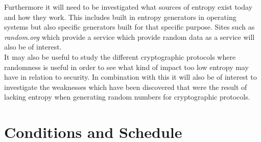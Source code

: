 \documentclass[a4paper,11pt]{report}
\begin{document}
\noindent
Furthermore it will need to be investigated what sources of entropy exist today
and how they work. This includes built in entropy generators in operating 
systems but also specific generators built for that specific purpose. Sites
such as \textit{random.org} which provide a service which provide random 
data as a service will also be of interest.
\\

\noindent
It may also be useful to study the different cryptographic protocols 
where randomness is useful in order to see what kind of impact too low entropy 
may have in relation to security. In combination with this it will also be 
of interest to investigate the weaknesses which have been discovered that were 
the result of lacking entropy when generating random numbers for cryptographic 
protocols.




\section*{Conditions and Schedule}
{}

\end{document}

